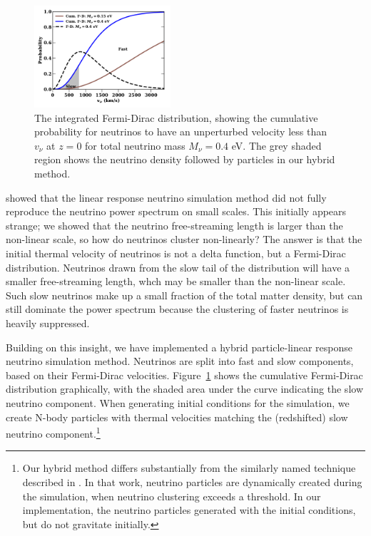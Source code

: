\documentclass[useAMS, usenatbib]{mnras}
\begin{document}
\begin{figure}
\includegraphics[width=0.45\textwidth]{nuplots/fermidirac.pdf}
  \caption{The integrated Fermi-Dirac distribution, showing the cumulative probability for neutrinos to have an unperturbed velocity less than $v_\nu$ at $z=0$ for total neutrino mass $M_\nu = 0.4$ eV.
  The grey shaded region shows the neutrino density followed by particles in our hybrid method.
  }
  \label{fig:fddistribution}
\end{figure}

\cite{AHB} showed that the linear response neutrino simulation method did not fully reproduce the neutrino power spectrum on small scales. This initially appears strange; we showed that the neutrino free-streaming length is larger than the non-linear scale, so how do neutrinos cluster non-linearly? The answer is that the initial thermal velocity of neutrinos is not a delta function, but a Fermi-Dirac distribution. Neutrinos drawn from the slow tail of the distribution will have a smaller free-streaming length, whch may be smaller than the non-linear scale. Such slow neutrinos make up a small fraction of the total matter density, but can still dominate the power spectrum because the clustering of faster neutrinos is heavily suppressed.

Building on this insight, we have implemented a hybrid particle-linear response neutrino simulation method. Neutrinos are split into fast and slow components, based on their Fermi-Dirac velocities. Figure~\ref{fig:fddistribution} shows the cumulative Fermi-Dirac distribution graphically, with the shaded area under the curve indicating the slow neutrino component. When generating initial conditions for the simulation, we create N-body particles with thermal velocities matching the (redshifted) slow neutrino component.\footnote{Our hybrid method differs substantially from the similarly named technique described in \cite{Brandbyge_2010}. In that work, neutrino particles are dynamically created during the simulation, when neutrino clustering exceeds a threshold. In our implementation, the neutrino particles generated with the initial conditions, but do not gravitate initially.}
\end{document}
